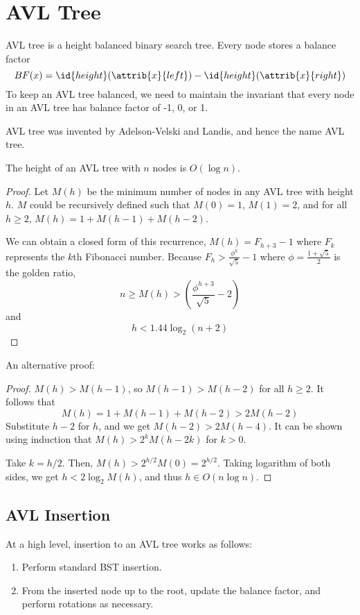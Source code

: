 \section{AVL Tree}

AVL tree is a height balanced binary search tree. Every node stores a balance factor 
$$
BF(x) = \id{height}(\attrib{x}{left}) - \id{height}(\attrib{x}{right})
$$
To keep an AVL tree balanced, we need to maintain the invariant that every node in an AVL tree has balance factor of -1, 0, or 1.

AVL tree was invented by Adelson-Velski and Landis, and hence the name AVL tree.

\begin{theorem}
    The height of an AVL tree with $n$ nodes is $O(\log n)$.
\end{theorem}

\begin{proof}
    Let $M(h)$ be the minimum number of nodes in any AVL tree with height $h$. $M$ could be recursively defined such that $M(0)=1$, $M(1)=2$, and for all $h \geq 2$, $M(h) = 1 + M(h-1) + M(h-2)$.
    
    We can obtain a closed form of this recurrence, $M(h) = F_{h+3} - 1$ where $F_k$ represents the $k$th Fibonacci number. Because $F_h > \frac{\phi^h}{\sqrt{5}} - 1$ where $\phi = \frac{1+\sqrt{5}}{2}$ is the golden ratio,
    $$
    n \geq M(h) > \left( \frac{\phi^{h+3}}{\sqrt{5}} - 2 \right) 
    $$
    and
    $$
    h < 1.44 \log_2 (n+2)
    $$
\end{proof}

An alternative proof:

\begin{proof}
    $M(h) > M(h-1)$, so $M(h-1)>M(h-2)$ for all $h\geq 2$. It follows that
    $$
    M(h) = 1 + M(h-1) + M(h-2) > 2M(h-2)
    $$
    Substitute $h-2$ for $h$, and we get $M(h-2) > 2M(h-4)$. It can be shown using induction that $M(h) > 2^k M(h-2k)$ for $k>0$.

    Take $k = h/2$. Then, $M(h) > 2^{h/2} M(0) = 2^{h/2}$. Taking logarithm of both sides, we get $h < 2 \log_2 M(h)$, and thus $h \in O(n \log n)$.   
\end{proof}

\subsection{AVL Insertion}

At a high level, insertion to an AVL tree works as follows:
\begin{enumerate}
    \item Perform standard BST insertion.
    \item From the inserted node up to the root, update the balance factor, and perform rotations as necessary.
\end{enumerate}

